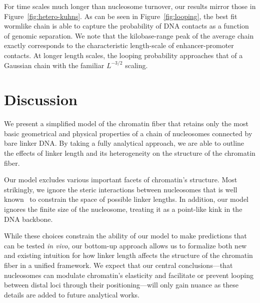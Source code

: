 \documentclass[%
 reprint,
superscriptaddress,
showpacs,preprintnumbers,
 amsmath,amssymb,
 aps,
 prl,
]{revtex4-1}
\begin{document}
For time scales much longer than nucleosome turnover, our results mirror those
    in Figure~\ref{fig:hetero-kuhns}.
As can be seen in Figure~\ref{fig:looping}, the best fit wormlike chain is able
    to capture the probability of DNA contacts as a function of genomic separation.
We note that the kilobase-range peak of the average chain exactly corresponds to
    the characteristic length-scale of enhancer-promoter contacts.
At longer length scales, the looping probability approaches that of a Gaussian
    chain with the familiar $L^{-3/2}$ scaling.

\section{\label{sec:discussion}Discussion}

We present a simplified model of the chromatin fiber that retains only the most
    basic geometrical and physical properties of a chain of nucleosomes
    connected by bare linker DNA.\@
By taking a fully analytical approach, we are able to outline the effects of
    linker length and its heterogeneity on the structure of the chromatin fiber.

Our model excludes various important facets of chromatin's structure.
Most strikingly, we ignore the steric interactions between nucleosomes that is
    well known~\cite{widom1992} to constrain the space of possible linker
    lengths.
In addition, our model ignores the finite size of the nucleosome, treating it as
    a point-like kink in the DNA backbone.

While these choices constrain the ability of our model to make predictions that
    can be tested \textit{in vivo}, our bottom-up approach allows us to
    formalize both new and existing intuition for how linker length affects the
    structure of the chromatin fiber in a unified framework.
We expect that our central conclusions---that nucleosomes can modulate
    chromatin's elasticity and facilitate or prevent looping between distal loci
    through their positioning---will only gain nuance as these details are added
    to future analytical works.
\end{document}
